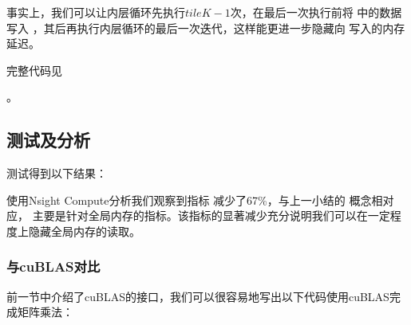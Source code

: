 \documentclass[letterpaper,10pt,english]{sphinxmanual}
\begin{document}
\sphinxAtStartPar
事实上，我们可以让内层循环先执行\(tileK - 1\)次，在最后一次执行前将
 中的数据写入 
，其后再执行内层循环的最后一次迭代，这样能更进一步隐藏向 
写入的内存延迟。

\sphinxAtStartPar
完整代码见%
\begin{footnote}[34]\sphinxAtStartFootnote
{}
%
\end{footnote}。


\subsection{测试及分析}
\label{\detokenize{chapter_accelerator/accelerator_practise:id21}}
\sphinxAtStartPar
测试得到以下结果：

\begin{sphinxVerbatim}[commandchars=\\\{\}]
  
       
\end{sphinxVerbatim}

\sphinxAtStartPar
使用Nsight Compute分析我们观察到指标 
减少了67\%，与上一小结的 
概念相对应，
主要是针对全局内存的指标。该指标的显著减少充分说明我们可以在一定程度上隐藏全局内存的读取。


\subsubsection{与cuBLAS对比}
\label{\detokenize{chapter_accelerator/accelerator_practise:cublas}}\label{\detokenize{chapter_accelerator/accelerator_practise:id22}}
\sphinxAtStartPar
前一节中介绍了cuBLAS的接口，我们可以很容易地写出以下代码使用cuBLAS完成矩阵乘法：
\end{document}
